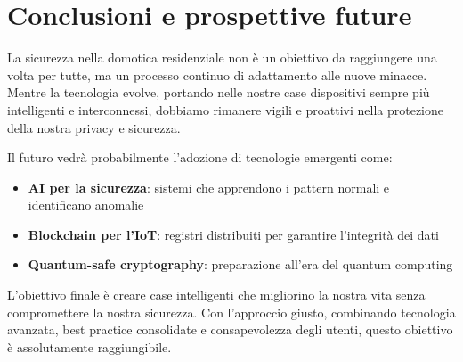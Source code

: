 \section{Conclusioni e prospettive future}

La sicurezza nella domotica residenziale non è un obiettivo da raggiungere una volta per tutte, ma un processo continuo di adattamento alle nuove minacce. Mentre la tecnologia evolve, portando nelle nostre case dispositivi sempre più intelligenti e interconnessi, dobbiamo rimanere vigili e proattivi nella protezione della nostra privacy e sicurezza.

Il futuro vedrà probabilmente l'adozione di tecnologie emergenti come:

\begin{itemize}
    \item \textbf{AI per la sicurezza}: sistemi che apprendono i pattern normali e identificano anomalie
    \item \textbf{Blockchain per l'IoT}: registri distribuiti per garantire l'integrità dei dati
    \item \textbf{Quantum-safe cryptography}: preparazione all'era del quantum computing
\end{itemize}

L'obiettivo finale è creare case intelligenti che migliorino la nostra vita senza compromettere la nostra sicurezza. Con l'approccio giusto, combinando tecnologia avanzata, best practice consolidate e consapevolezza degli utenti, questo obiettivo è assolutamente raggiungibile.